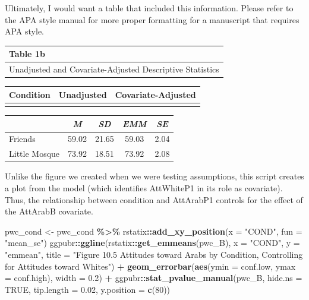 \documentclass[
  11pt,
]{book}
\newenvironment{Shaded}{\begin{snugshade}}{\end{snugshade}}
\newcommand{\AttributeTok}[1]{\textcolor[rgb]{0.27,0.27,0.27}{#1}}
\newcommand{\ConstantTok}[1]{\textcolor[rgb]{0.37,0.37,0.37}{#1}}
\newcommand{\DecValTok}[1]{\textcolor[rgb]{0.06,0.06,0.06}{#1}}
\newcommand{\FloatTok}[1]{\textcolor[rgb]{0.06,0.06,0.06}{#1}}
\newcommand{\FunctionTok}[1]{\textcolor[rgb]{0.27,0.27,0.27}{\textbf{#1}}}
\newcommand{\NormalTok}[1]{#1}
\newcommand{\OtherTok}[1]{\textcolor[rgb]{0.37,0.37,0.37}{#1}}
\newcommand{\SpecialCharTok}[1]{\textcolor[rgb]{0.43,0.43,0.43}{\textbf{#1}}}
\newcommand{\StringTok}[1]{\textcolor[rgb]{0.5,0.5,0.5}{#1}}
\begin{document}
Ultimately, I would want a table that included this information. Please refer to the APA style manual for more proper formatting for a manuscript that requires APA style.

\begin{longtable}[]{@{}l@{}}
\toprule\noalign{}
Table 1b \\
\midrule\noalign{}
\endhead
\bottomrule\noalign{}
\endlastfoot
Unadjusted and Covariate-Adjusted Descriptive Statistics \\
\end{longtable}

\begin{longtable}[]{@{}lcc@{}}
\toprule\noalign{}
Condition & Unadjusted & Covariate-Adjusted \\
\midrule\noalign{}
\endhead
\bottomrule\noalign{}
\endlastfoot
\end{longtable}

\begin{longtable}[]{@{}lcccc@{}}
\toprule\noalign{}
& \emph{M} & \emph{SD} & \emph{EMM} & \emph{SE} \\
\midrule\noalign{}
\endhead
\bottomrule\noalign{}
\endlastfoot
Friends & 59.02 & 21.65 & 59.03 & 2.04 \\
Little Mosque & 73.92 & 18.51 & 73.92 & 2.08 \\
\end{longtable}

Unlike the figure we created when we were testing assumptions, this script creates a plot from the model (which identifies AttWhiteP1 in its role as covariate). Thus, the relationship between condition and AttArabP1 controls for the effect of the AttArabB covariate.

\begin{Shaded}
\begin{Highlighting}[]
\NormalTok{pwc\_cond }\OtherTok{\textless{}{-}}\NormalTok{ pwc\_cond }\SpecialCharTok{\%\textgreater{}\%}
\NormalTok{    rstatix}\SpecialCharTok{::}\FunctionTok{add\_xy\_position}\NormalTok{(}\AttributeTok{x =} \StringTok{"COND"}\NormalTok{, }\AttributeTok{fun =} \StringTok{"mean\_se"}\NormalTok{)}
\NormalTok{ggpubr}\SpecialCharTok{::}\FunctionTok{ggline}\NormalTok{(rstatix}\SpecialCharTok{::}\FunctionTok{get\_emmeans}\NormalTok{(pwc\_B), }\AttributeTok{x =} \StringTok{"COND"}\NormalTok{, }\AttributeTok{y =} \StringTok{"emmean"}\NormalTok{, }\AttributeTok{title =} \StringTok{"Figure 10.5 Attitudes toward Arabs by Condition, Controlling for Attitudes toward Whites"}\NormalTok{) }\SpecialCharTok{+}
    \FunctionTok{geom\_errorbar}\NormalTok{(}\FunctionTok{aes}\NormalTok{(}\AttributeTok{ymin =}\NormalTok{ conf.low, }\AttributeTok{ymax =}\NormalTok{ conf.high), }\AttributeTok{width =} \FloatTok{0.2}\NormalTok{) }\SpecialCharTok{+}
\NormalTok{    ggpubr}\SpecialCharTok{::}\FunctionTok{stat\_pvalue\_manual}\NormalTok{(pwc\_B, }\AttributeTok{hide.ns =} \ConstantTok{TRUE}\NormalTok{, }\AttributeTok{tip.length =} \FloatTok{0.02}\NormalTok{,}
        \AttributeTok{y.position =} \FunctionTok{c}\NormalTok{(}\DecValTok{80}\NormalTok{))}
\end{Highlighting}
\end{Shaded}
\end{document}
